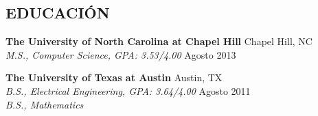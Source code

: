 \documentclass[line,margin,letterpaper]{res}
\begin{document}
\address{alfredo@miranda.io - http://miranda.io}

\begin{resume}
 
\section{EDUCACI\'ON}
  {\bf The University of North Carolina at Chapel Hill} 
  \hfill Chapel Hill, NC \\
  \emph{M.S., Computer Science, GPA: 3.53/4.00} \hfill Agosto 2013

  {\bf The University of Texas at Austin} \hfill Austin, TX \\
  \emph{B.S., Electrical Engineering, GPA: 3.64/4.00} \hfill  Agosto 2011 \\
  \emph{B.S., Mathematics}
 

\end{resume}
\end{document}
